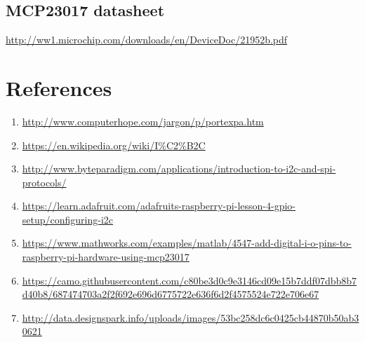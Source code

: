 \documentclass[11pt,a4paper]{article}
\begin{document}
	\subsection{MCP23017 datasheet}
	
	\url{http://ww1.microchip.com/downloads/en/DeviceDoc/21952b.pdf}
	
	\newpage
    \section{References}
    \begin{enumerate}
    	\item \url{http://www.computerhope.com/jargon/p/portexpa.htm}
    	\item \url{https://en.wikipedia.org/wiki/I%C2%B2C}
    	\item \url{http://www.byteparadigm.com/applications/introduction-to-i2c-and-spi-protocols/}
    	\item \url{https://learn.adafruit.com/adafruits-raspberry-pi-lesson-4-gpio-setup/configuring-i2c}
    	\item \url{https://www.mathworks.com/examples/matlab/4547-add-digital-i-o-pins-to-raspberry-pi-hardware-using-mcp23017}
    	\item \url{https://camo.githubusercontent.com/c80be3d0c9e3146cd09e15b7ddf07dbb8b7d40b8/687474703a2f2f692e696d6775722e636f6d2f4575524e722e706e67}
    	\item \url{http://data.designspark.info/uploads/images/53bc258dc6c0425cb44870b50ab30621}
    \end{enumerate}
    
\end{document}
